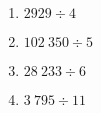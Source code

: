 


\begin{multicols}{2}
\begin{enumerate}
	
	\item $2929\div4$
	\item $102~350\div5$
	\item $28~233 \div 6$
	\item $3~795\div11$

\end{enumerate}
\end{multicols}
